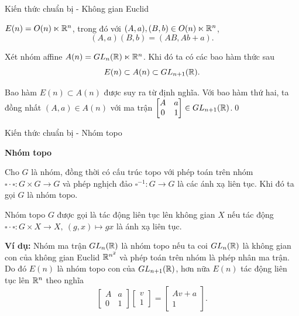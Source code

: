 \begin{frame}{Kiến thức chuẩn bị - Không gian Euclid}
    \begin{corollary1}
        $E(n) = O(n) \ltimes \mathbb R^n$, trong đó với $(A,a),(B,b) \in O(n) \ltimes \mathbb R^n$,
        $$
            (A,a)(B,b) = (AB,Ab+a).
        $$
    \end{corollary1}
    \begin{proposition}
        Xét \alert{nhóm affine} $A(n) = GL_n(\mathbb R) \ltimes \mathbb R^n$. Khi đó ta có các bao hàm thức sau
        $$
            E(n) \subset A(n) \subset GL_{n+1}(\mathbb R).
        $$
    \end{proposition}
    \startproof Bao hàm $E(n) \subset A(n)$ được suy ra từ định nghĩa. Với bao hàm thứ hai, ta đồng nhất $(A,a) \in A(n)$ với ma trận $\begin{bmatrix}A & a\\ 0 & 1\end{bmatrix} \in GL_{n+1}(\mathbb R)$.\qed
\end{frame}

\begin{frame}{Kiến thức chuẩn bị - Nhóm topo}
    \begin{center}
        \Large{\textbf{Nhóm topo}}
    \end{center}

    \begin{define}
        Cho $G$ là nhóm, đồng thời có cấu trúc topo với phép toán trên nhóm $\square\cdot\square: G \times G \rightarrow G$ và phép nghịch đảo $\square^{-1}: G \rightarrow G$ là các ánh xạ liên tục. Khi đó ta gọi $G$ là \alert{nhóm topo}.
    \end{define}

    \begin{define}
        Nhóm topo $G$ được gọi là \alert{tác động liên tục} lên không gian $X$ nếu tác động $\square \cdot \square: G \times X \rightarrow X,\ (g,x) \mapsto gx$ là ánh xạ liên tục.
    \end{define}

    \textbf{Ví dụ:} Nhóm ma trận $GL_n(\mathbb R)$ là nhóm topo nếu ta coi $GL_n(\mathbb R)$ là không gian con của không gian Euclid $\mathbb R^{n^2}$ và phép toán trên nhóm là phép nhân ma trận. Do đó $E(n)$ là nhóm topo con của $GL_{n+1}(\mathbb R)$, hơn nữa $E(n)$ tác động liên tục lên $\mathbb R^n$ theo nghĩa
    $$
        \begin{bmatrix}A & a\\ 0 & 1\end{bmatrix} \begin{bmatrix}v \\ 1\end{bmatrix} = \begin{bmatrix}Av + a \\ 1\end{bmatrix}.
    $$
\end{frame}

